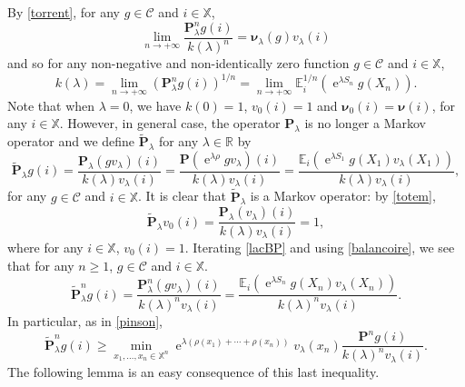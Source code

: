 \documentclass[12pt]{amsart}
\theoremstyle{definition}
\numberwithin{equation}{section}
\def\bb#1{\mathbb{#1}}
\def\bs#1{\boldsymbol{#1}}
\def\bf#1{\mathbf{#1}}
\def\scr#1{\mathscr{#1}}
\def\tbf#1{\tilde{\mathbf{#1}}}
\def\geq{\geqslant}
\renewcommand\ll{\lambda}
\DeclareMathOperator{\e}{e}
\begin{document}
By \eqref{torrent}, for any $g \in \scr C$ and $i \in \bb X$,
\[
\lim_{n\to+\infty} \frac{\bf P_{\ll}^n g(i)}{k(\ll)^n} = \bs \nu_{\ll}(g) v_{\ll}(i)
\]
and so for any non-negative and non-identically zero function $g \in \scr C$ and $i \in \bb X$,
\begin{equation}
\label{colombe}
k(\ll) = \lim_{n\to+\infty} \left( \bf P_{\ll}^n g(i) \right)^{1/n} = \lim_{n\to+\infty} \bb E_i^{1/n} \left( \e^{\ll S_n} g(X_n) \right).
\end{equation}
Note that when $\ll = 0$, we have $k(0) = 1$, $v_0(i)=1$ and $\bs \nu_0(i) = \bs \nu(i)$, for any $i \in \bb X$. However, in general case, the operator $\bf P_{\ll}$ is no longer a Markov operator and we define $\tbf P_{\ll}$ for any $\ll \in \bb R$ by
\begin{equation}
	\label{lacBP}
	\tbf P_{\ll}g(i) = \frac{\bf P_{\ll}(gv_{\ll})(i)}{k(\ll)v_{\ll}(i)} = \frac{\bf P\left( \e^{\ll \rho}gv_{\ll} \right)(i)}{k(\ll)v_{\ll}(i)} = \frac{ \bb E_i \left( \e^{\ll S_1} g(X_1) v_{\ll}(X_1) \right)}{k(\ll)v_{\ll}(i)},
\end{equation}
for any $g \in \scr C$ and $i \in \bb X$. It is clear that $\tbf P_{\ll}$ is a Markov operator: by \eqref{totem},
\[
\tbf P_{\ll}v_0(i) = \frac{\bf P_{\ll}(v_{\ll})(i)}{k(\ll)v_{\ll}(i)} = 1,
\]
where for any $i \in \bb X$, $v_0(i) = 1$. Iterating \eqref{lacBP} and using \eqref{balancoire}, we see that  for any $n \geq 1$, $g \in \scr C$ and $i \in \bb X$.
\begin{equation}
	\label{horizon}
	\tbf P_{\ll}^n g(i) = \frac{\bf P_{\ll}^n(gv_{\ll})(i)}{k(\ll)^nv_{\ll}(i)} = \frac{ \bb E_i \left( \e^{\ll S_n} g(X_n) v_{\ll}(X_n) \right)}{k(\ll)^nv_{\ll}(i)}.
\end{equation}
In particular, as in \eqref{pinson},
\[
\tbf P_{\ll}^n g(i) \geq \min_{x_1, \dots, x_n \in \bb X^n} \e^{\ll \left(\rho(x_1) + \cdots + \rho(x_n)\right)}v_{\ll}(x_n) \frac{\bf P^n g(i)}{k(\ll)^nv_{\ll}(i)}.
\]
The following lemma is an easy consequence of this last inequality.
\end{document}
